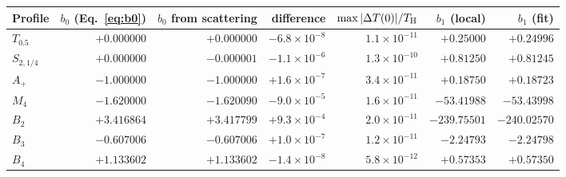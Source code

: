 \begin{tabular}{@{}lrrrrrr@{}}
\toprule
Profile & $b_0$ (Eq.~\eqref{eq:b0}) & $b_0$ from scattering & difference & $\max|\Delta T(0)|/T_{\mathrm H}$ & $b_1$ (local) & $b_1$ (fit) \\
\midrule
$T_{0.5}$ & $+0.000000$ & $+0.000000$ & $-6.8\times10^{-8}$ & $1.1\times10^{-11}$ & $+0.25000$ & $+0.24996$ \\
$S_{2,1/4}$ & $+0.000000$ & $-0.000001$ & $-1.1\times10^{-6}$ & $1.3\times10^{-10}$ & $+0.81250$ & $+0.81245$ \\
$A_+$ & $-1.000000$ & $-1.000000$ & $+1.6\times10^{-7}$ & $3.4\times10^{-11}$ & $+0.18750$ & $+0.18723$ \\
$M_4$ & $-1.620000$ & $-1.620090$ & $-9.0\times10^{-5}$ & $1.6\times10^{-11}$ & $-53.41988$ & $-53.43998$ \\
$B_2$ & $+3.416864$ & $+3.417799$ & $+9.3\times10^{-4}$ & $2.0\times10^{-11}$ & $-239.75501$ & $-240.02570$ \\
\midrule
$B_3$ & $-0.607006$ & $-0.607006$ & $+1.0\times10^{-7}$ & $1.2\times10^{-11}$ & $-2.24793$ & $-2.24798$ \\
$B_4$ & $+1.133602$ & $+1.133602$ & $-1.4\times10^{-8}$ & $5.8\times10^{-12}$ & $+0.57353$ & $+0.57350$ \\
\bottomrule
\end{tabular}
